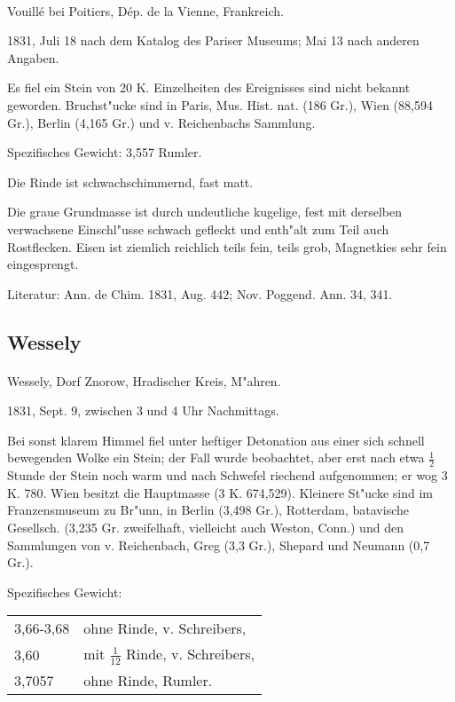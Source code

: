 \documentclass[a4paper, 11pt, oneside]{article}
\begin{document}
\paragraph{}
Vouillé bei Poitiers, Dép. de la Vienne, Frankreich.

1831, Juli 18 nach dem Katalog des Pariser Museums; Mai 13 nach anderen Angaben.

Es fiel ein Stein von 20 K. Einzelheiten des Ereignisses sind nicht bekannt geworden. Bruchst"ucke sind in Paris, Mus. Hist. nat. (186 Gr.), Wien (88,594 Gr.), Berlin (4,165 Gr.) und v. Reichenbachs Sammlung.

Spezifisches Gewicht: 3,557 Rumler.

Die Rinde ist schwachschimmernd, fast matt.

Die graue Grundmasse ist durch undeutliche kugelige, fest mit derselben verwachsene Einschl"usse schwach gefleckt und enth"alt zum Teil auch Rostflecken. Eisen ist ziemlich reichlich teils fein, teils grob, Magnetkies sehr fein eingesprengt.

\footnotesize
Literatur: Ann. de Chim. 1831, Aug. 442; Nov. Poggend. Ann. 34, 341.

\subsection{Wessely}
\normalsize
\paragraph{}
Wessely, Dorf Znorow, Hradischer Kreis, M"ahren.

1831, Sept. 9, zwischen 3 und 4 Uhr Nachmittags.

Bei sonst klarem Himmel fiel unter heftiger Detonation aus einer sich schnell bewegenden Wolke ein Stein; der Fall wurde beobachtet, aber erst nach etwa $\frac{1}{2}$ Stunde der Stein noch warm und nach Schwefel riechend aufgenommen; er wog 3 K. 780. Wien besitzt die Hauptmasse (3 K. 674,529). Kleinere St"ucke sind im Franzensmuseum zu Br"unn, in Berlin (3,498 Gr.), Rotterdam, batavische Gesellsch. (3,235 Gr. zweifelhaft, vielleicht auch Weston, Conn.) und den Sammlungen von v. Reichenbach, Greg (3,3 Gr.), Shepard und Neumann (0,7 Gr.).

Spezifisches Gewicht:  
\begin{table}[!ht]
    \centering
    \begin{tabular}{l l}
        3,66-3,68 & ohne Rinde, v. Schreibers,\\
        3,60 & mit $\frac{1}{12}$ Rinde, v. Schreibers,\\
        3,7057 & ohne Rinde, Rumler.
    \end{tabular}
\end{table}
\end{document}
